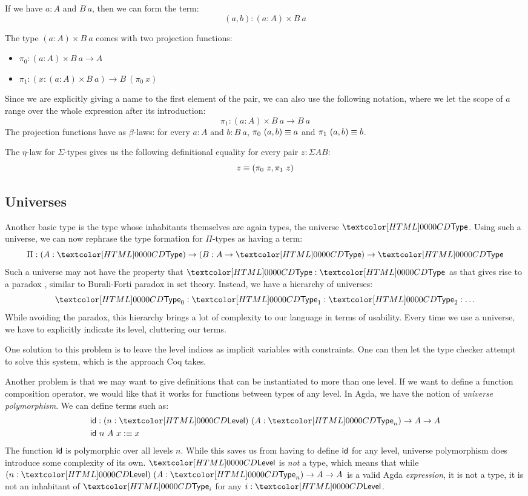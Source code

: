 If we have $a : A$ and $B\ a$, then we can form the term:
$$
(a, b) : (a : A) \times B\ a
$$

The type $(a : A) \times B\ a$ comes with two projection functions:
\begin{itemize}
\item $\pi_0 : (a : A) \times B\ a \to A$
\item $\pi_1 : (x : (a : A) \times B\ a) \to B\ (\pi_0\ x)$
\end{itemize}
Since we are explicitly giving a name to the first element of the
pair, we can also use the following notation, where we let the scope
of $a$ range over the whole expression after its introduction:
$$
\pi_1 : (a : A) \times B\ a \to B\ a
$$
The projection functions have as $\beta$-laws: for every $a : A$ and
$b : B\ a$, $\pi_0\ (a,b) \equiv a$ and $\pi_1\ (a,b) \equiv b$.

The $\eta$-law for $\Sigma$-types gives us the following definitional
equality for every pair $z : \Sigma A B$:
$$
z \equiv (\pi_0\ z , \pi_1\ z)
$$

\subsection{Universes}

Another basic type is the type whose inhabitants themselves are again
types, the universe $\Type$. Using such a universe, we can now
rephrase the type formation for $\Pi$-types as having a term:
$$
\Pi : (A : \Type) \to (B : A \to \Type) \to \Type
$$
Such a universe may not have the property that $\Type : \Type$ as that
gives rise to a paradox \cite{Girard1972,Coquand1986}, similar to
Burali-Forti paradox in set theory. Instead, we have a hierarchy of
universes:
$$
\Type_0 : \Type_1 : \Type_2 : \hdots
$$
While avoiding the paradox, this hierarchy brings a lot of complexity
to our language in terms of usability. Every time we use a universe,
we have to explicitly indicate its level, cluttering our terms.

One solution to this problem is to leave the level indices as implicit
variables with constraints. One can then let the type checker attempt
to solve this system, which is the approach Coq takes. 

Another problem is that we may want to give definitions that can be
instantiated to more than one level. If we want to define a function
composition operator, we would like that it works for functions
between types of any level. In Agda, we have the notion of
\emph{universe polymorphism}. We can define terms such as:
\begin{align*}
  &\id : (n : \Level)\ (A : \Type_n) \to A \to A \\
  &\id\ n\ A\ x \ddefeq x
\end{align*}
The function $\id$ is polymorphic over all levels $n$. While this
saves us from having to define $\id$ for any level, universe
polymorphism does introduce some complexity of its own. $\Level$ is
\emph{not} a type, which means that while
$(n : \Level)\ (A : \Type_n) \to A \to A$ is a valid Agda
\emph{expression}, it is not a type, \ie it is not an inhabitant of
$\Type_i$ for any $i : \Level$.


